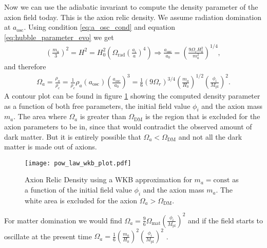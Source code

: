 \documentclass[twoside,a4paper, 12pt]{article}
\numberwithin{equation}{section}
\begin{document}
\noindent
Now we can use the adiabatic invariant to compute the density parameter of the 
axion field today. This is the axion relic density.
We assume radiation domination at $a_\mathrm{osc}$.
Using condition \eqref{eq:a_osc_cond} and equation \eqref{eq:hubble_parameter_evo} we get
\begin{align*}
    \left(\frac{m_a}{3}\right)^2 = H^2 = H_0^2 \left(
    \Omega_\mathrm{rad} \left( \frac{a_i}{a} \right)^4
\right) \Rightarrow \frac{a_\mathrm{osc}}{a_0} = \left( \frac{9 \Omega_r H_0^2}{m_a^2} \right)^{1/4},
\end{align*}
and therefore
\begin{align*}
    \Omega_a = \frac{\rho_a}{\rho_c} = \frac{1}{\rho_c} \rho_a(a_\mathrm{osc}) \left( \frac{a_\mathrm{osc}}{a_0} \right)^3
             = \frac{1}{6} \left( 9 \Omega_r \right)^{3/4} \left( \frac{m_a}{H_0} \right)^{1/2} \left( \frac{\phi_i}{M_\mathrm{pl}} \right)^2.
\end{align*}
A contour plot can be found in figure \ref{fig:wkb_ard} showing the computed density parameter as a function of both free parameters, the
initial field value $\phi_i$ and the axion mass $m_a$. The area where $\Omega_a$ is greater than $\Omega_\mathrm{DM}$ is the region that is excluded for the axion parameters to be in,
since that would contradict the observed amount of dark matter. But it is entirely possible that $\Omega_a < \Omega_\mathrm{DM}$ and not all the dark matter
is made out of axions.
\begin{figure}[H]
    \centering
    \texttt{[image: pow\_law\_wkb\_plot.pdf]}
    \caption{Axion Relic Density using a WKB approximation for $m_a = \mathrm{const}$
    as a function of the initial field value $\phi_i$ and the axion mass $m_a$. The white area is excluded for the axion $\Omega_a > \Omega_\mathrm{DM}$.
    }
    \label{fig:wkb_ard}
\end{figure}
For matter domination we would find
$\Omega_a = \frac{9}{6} \Omega_\mathrm{mat} \left( \frac{\phi_i}{M_\mathrm{pl}} \right)^2$ and
if the field starts to oscillate at the present time $\Omega_a = \frac{1}{6} \left( \frac{m_a}{H_0} \right)^2 \left( \frac{\phi_i}{M_\mathrm{pl}} \right)^2$ \cite[Eq. 61]{MarshAxionCosmo}.
    
\end{document}
